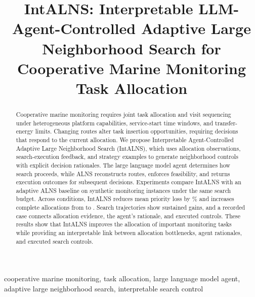 \documentclass[]{spie}
\title{IntALNS: Interpretable LLM-Agent-Controlled Adaptive Large Neighborhood Search for Cooperative Marine Monitoring Task Allocation}
\renewcommand{\keywords}[1]{%
\par\vspace{0.5ex}{\noindent\normalsize\bfseries Keywords}\enspace #1%
\vspace{0.5ex}}
\begin{document}
\maketitle
\begin{abstract}
Cooperative marine monitoring requires joint task allocation and visit sequencing under heterogeneous platform capabilities, service-start time windows, and transfer-energy limits. Changing routes alter task insertion opportunities, requiring decisions that respond to the current allocation. We propose Interpretable Agent-Controlled Adaptive Large Neighborhood Search (IntALNS), which uses allocation observations, search-execution feedback, and strategy examples to generate neighborhood controls with explicit decision rationales. The large language model agent determines how search proceeds, while ALNS reconstructs routes, enforces feasibility, and returns execution outcomes for subsequent decisions. Experiments compare IntALNS with an adaptive ALNS baseline on synthetic monitoring instances under the same search budget. Across \PairCount{} conditions, IntALNS reduces mean priority loss by \PriorityReduction\% and increases complete allocations from \BasicComplete{} to \AgentComplete{}. Search trajectories show sustained gains, and a recorded case connects allocation evidence, the agent's rationale, and executed controls. These results show that IntALNS improves the allocation of important monitoring tasks while providing an interpretable link between allocation bottlenecks, agent rationales, and executed search controls.
\end{abstract}
\keywords{cooperative marine monitoring, task allocation, large language model agent, adaptive large neighborhood search, interpretable search control}



\newpage

\FloatBarrier



\end{document}
